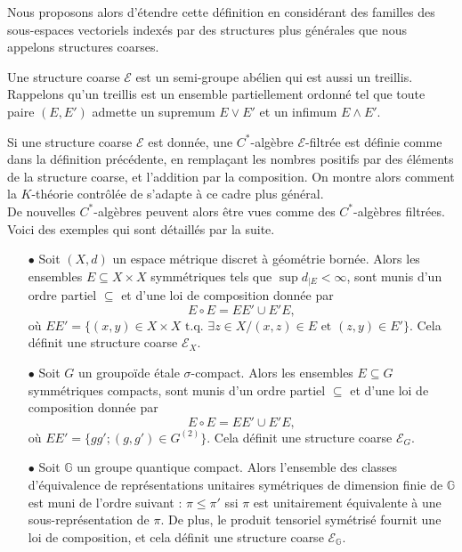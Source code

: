 Nous proposons alors d'étendre cette définition en considérant des familles des sous-espaces vectoriels indexés par des structures plus générales que nous appelons structures coarses. 

\begin{definitionfr}
Une structure coarse $\mathcal E$ est un semi-groupe abélien qui est aussi un treillis. %
Rappelons qu'un treillis est un ensemble partiellement ordonné tel que toute paire $(E,E')$ admette un supremum $E\vee E'$ et un infimum $E\wedge E'$.
\end{definitionfr}

Si une structure coarse $\mathcal E$ est donnée, une $C^*$-algèbre $\mathcal E$-filtrée est définie comme dans la définition précédente, en remplaçant les nombres positifs par des éléments de la structure coarse, et l'addition par la composition. On montre alors comment la $K$-théorie contrôlée de \cite{OY2} s'adapte à ce cadre plus général.\\

De nouvelles $C^*$-algèbres peuvent alors être vues comme des $C^*$-algèbres filtrées. Voici des exemples qui sont détaillés par la suite.
\begin{itemize} 
\item[$\bullet$] Soit $(X,d)$ un espace métrique discret à géométrie bornée. Alors les ensembles $E\subseteq X\times X$ symmétriques tels que $\sup d_{|E}<\infty$, sont munis d'un ordre partiel $\subseteq$ et d'une loi de composition donnée par 
\[E\circ E = EE'\cup E'E,\]
où $EE' = \{(x,y)\in X\times X \text{ t.q. }\exists z\in X / (x,z)\in E \text{ et }(z,y)\in E'\}$. Cela définit une structure coarse $\mathcal E_X$.
\item[$\bullet$] Soit $G$ un groupoïde étale $\sigma$-compact. Alors les ensembles $E\subseteq G$ symmétriques compacts, sont munis d'un ordre partiel $\subseteq$ et d'une loi de composition donnée par 
\[E\circ E = EE'\cup E'E,\]
où $EE' = \{gg' ; (g,g')\in G^{(2)}\}$. Cela définit une structure coarse $\mathcal E_G$.
\item[$\bullet$] Soit $\mathbb G$ un groupe quantique compact. Alors l'ensemble des classes d'équivalence de représentations unitaires symétriques de dimension finie de $\mathbb G$ est muni de l'ordre suivant : $\pi\leq \pi'$ ssi $\pi$ est unitairement équivalente à une sous-représentation de $\pi$. De plus, le produit tensoriel symétrisé fournit une loi de composition, et cela définit une structure coarse $\mathcal E_{\mathbb G}$.\\
\end{itemize} 

